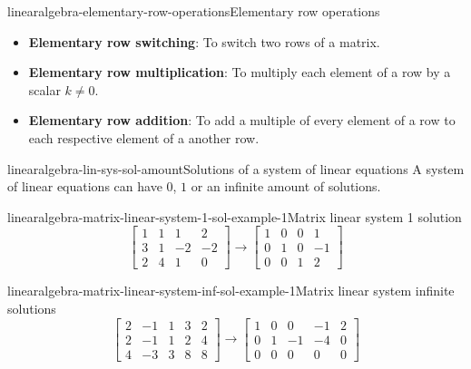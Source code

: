 \documentclass[preview]{standalone}
\begin{document}
\begin{snippetdefinition}{linearalgebra-elementary-row-operations}{Elementary row operations}
    \begin{itemize}
        \item \textbf{Elementary row switching}:
        To switch two rows of a matrix.
        \item \textbf{Elementary row multiplication}:
        To multiply each element of a row by
        a scalar \(k \neq 0\).
        \item \textbf{Elementary row addition}:
        To add a multiple of every element of a row
        to each respective element of a another row.
    \end{itemize}

\end{snippetdefinition}

\begin{snippetproposition}{linearalgebra-lin-sys-sol-amount}{Solutions of a system of linear equations}
    A system of linear equations can have \(0\), \(1\)
    or an infinite amount of solutions.
\end{snippetproposition}

\begin{snippetexample}{linearalgebra-matrix-linear-system-1-sol-example-1}{Matrix linear system 1 solution}
    \[
        \begin{bmatrix}
            1 & 1 & 1 & 2 \\
            3 & 1 & -2 & -2 \\
            2 & 4 & 1 & 0
        \end{bmatrix}
        \rightarrow
        \begin{bmatrix}
            1 & 0 & 0 & 1 \\
            0 & 1 & 0 & -1 \\
            0 & 0 & 1 & 2
        \end{bmatrix}
    \]
\end{snippetexample}

\begin{snippetexample}{linearalgebra-matrix-linear-system-inf-sol-example-1}{Matrix linear system infinite solutions}
    \[
        \begin{bmatrix}
            2 & -1 & 1 & 3 & 2 \\
            2 & -1 & 1 & 2 & 4 \\
            4 & -3 & 3 & 8 & 8
        \end{bmatrix}
        \rightarrow
        \begin{bmatrix}
            1 & 0 & 0 & -1 & 2 \\
            0 & 1 & -1 & -4 & 0 \\
            0 & 0 & 0 & 0 & 0
        \end{bmatrix}
    \]
\end{snippetexample}
\end{document}

